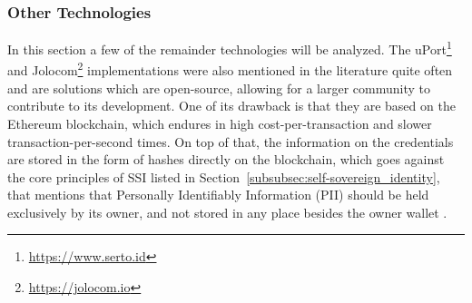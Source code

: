 \subsubsection{Other Technologies}
\label{subsubsec:other_technologies}

In this section a few of the remainder technologies will be analyzed.
The uPort\footnote{\url{https://www.serto.id}} and Jolocom\footnote{\url{https://jolocom.io}} implementations were also mentioned in the literature quite often and are solutions which are open-source, allowing for a larger community to contribute to its development. 
One of its drawback is that they are based on the Ethereum blockchain, which endures in high cost-per-transaction and slower transaction-per-second times.
On top of that, the information on the credentials are stored in the form of hashes directly on the blockchain, which goes against the core principles of SSI listed in Section~\ref{subsubsec:self-sovereign_identity}, that mentions that Personally Identifiably Information (PII) should be held exclusively by its owner, and not stored in any place besides the owner wallet \cite{gebresilassie2020distributed}.

